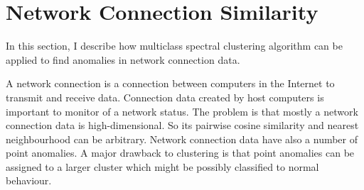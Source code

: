 \section{Network Connection Similarity}
\label{sec:connectionsimilarity}
In this section, I describe how multiclass spectral clustering algorithm can be applied to find anomalies in network connection data. 

A network connection is a connection between computers in the Internet to transmit and receive data. 
Connection data created by host computers is important to monitor of a network status. 
The problem is that mostly a network connection data is high-dimensional. 
So its pairwise cosine similarity and nearest neighbourhood can be arbitrary. 
Network connection data have also a number of point anomalies. 
A major drawback to clustering is that point anomalies can be assigned to a larger cluster which might be possibly classified to normal behaviour. 

